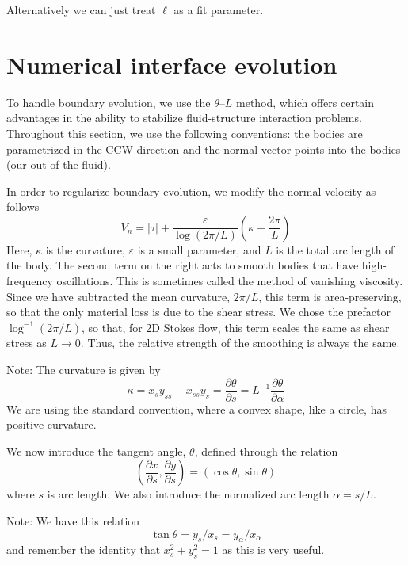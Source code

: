 \documentclass[11pt]{article}
\newcommand{\pd}[2]    { \frac{\partial #1} {\partial #2} }
\newcommand{\abs}[1]{\left| #1 \right|}
\newcommand{\eps}{\varepsilon}
\newcommand{\atau}{\abs{\tau}}
\newcommand{\pderiv}[2]{\frac{\partial #1}{\partial #2}}
\newcommand{\thL}{$\theta$--$L$}
\newcommand{\Vn}{V_n}
\begin{document}
Alternatively we can just treat $\ell$ as a fit parameter.

\section{Numerical interface evolution}

To handle boundary evolution, we use the {\thL} method, which offers certain advantages in the ability to stabilize fluid-structure interaction problems. Throughout this section, we use the following conventions: the bodies are parametrized in the CCW direction and the normal vector points into the bodies (our out of the fluid).

In order to regularize boundary evolution, we modify the normal velocity as follows
\begin{equation}
\label{eqn:Vn}
\Vn = \atau + \frac{\eps}{\log \left(2\pi/L \right)} \left(\kappa - \frac{2 \pi}{L} \right)
\end{equation}
Here, $\kappa$ is the curvature, $\eps$ is a small parameter, and $L$ is the total arc length of the body. The second term on the right acts to smooth bodies that have high-frequency oscillations. This is sometimes called the method of vanishing viscosity. Since we have subtracted the mean curvature, $2\pi/L$, this term is area-preserving, so that the only material loss is due to the shear stress. We chose the prefactor $\log^{-1} \left(2\pi/L \right)$, so that, for 2D Stokes flow, this term scales the same as shear stress as $L \to 0$. Thus, the relative strength of the smoothing is always the same. 


Note: The curvature is given by
\begin{equation}
\kappa = x_s y_{ss} - x_{ss} y_s = \pd{\theta}{s} = L^{-1} \pd{\theta}{\alpha}
\end{equation}
We are using the standard convention, where a convex shape, like a circle, has positive curvature.

We now introduce the tangent angle, $\theta$, defined through the relation
\begin{equation}
\left( \pderiv{x}{s}, \pderiv{y}{s} \right) = \left(\cos \theta, \sin \theta \right)
\end{equation}
where $s$ is arc length. We also introduce the normalized arc length $\alpha = s / L$. 

Note: We have this relation
\begin{equation}
\tan \theta = y_s/x_s = y_\alpha / x_\alpha
\end{equation}
and remember the identity that $x_s^2 + y_s^2 = 1$ as this is very useful.
\end{document}
